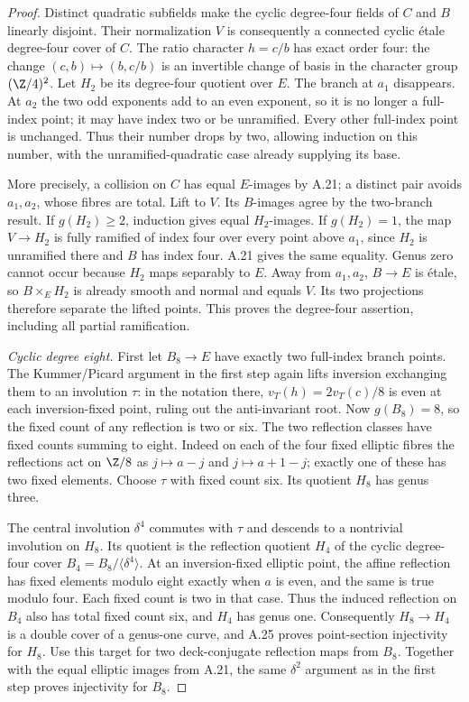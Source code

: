 \begin{proof}
Distinct quadratic subfields make the cyclic
degree-four fields of $C$ and $B$ linearly disjoint.
Their normalization $V$ is consequently a connected
cyclic \'etale degree-four cover of $C$. The ratio
character $h=c/b$ has exact order four: the change
$(c,b)\mapsto(b,c/b)$ is an invertible change of basis
in the character group $(\Z/4)^2$. Let $H_2$ be its
degree-four quotient over $E$. The branch at $a_1$
disappears. At $a_2$ the two odd exponents add to an
even exponent, so it is no longer a full-index point;
it may have index two or be unramified. Every other
full-index point is unchanged. Thus their number drops
by two, allowing induction on this number, with the
unramified-quadratic case already supplying its base.

More precisely, a collision on $C$ has equal $E$-images
by A.21; a distinct pair avoids $a_1,a_2$, whose fibres
are total. Lift to $V$. Its $B$-images agree by the
two-branch result. If $g(H_2)\ge2$, induction gives
equal $H_2$-images. If $g(H_2)=1$, the map $V\to H_2$
is fully ramified of index four over every point above
$a_1$, since $H_2$ is unramified there and $B$ has
index four. A.21 gives the same equality. Genus zero
cannot occur because $H_2$ maps separably to $E$.
Away from $a_1,a_2$, $B\to E$ is \'etale, so
$B\times_EH_2$ is already smooth and normal and equals
$V$. Its two projections therefore separate the lifted
points. This proves the degree-four assertion, including
all partial ramification.

\emph{Cyclic degree eight.}
First let $B_8\to E$ have exactly two full-index branch
points. The Kummer/Picard argument in the first step
again lifts inversion exchanging them to an involution
$\tau$: in the notation there, $v_T(h)=2v_T(c)/8$ is
even at each inversion-fixed point, ruling out the
anti-invariant root. Now $g(B_8)=8$, so the fixed count
of any reflection is two or six. The two reflection
classes have fixed counts summing to eight. Indeed on
each of the four fixed elliptic fibres the reflections
act on $\Z/8$ as $j\mapsto a-j$ and $j\mapsto a+1-j$;
exactly one of these has two fixed elements. Choose
$\tau$ with fixed count six. Its quotient $H_8$ has
genus three.

The central involution $\delta^4$ commutes with $\tau$
and descends to a nontrivial involution on $H_8$. Its
quotient is the reflection quotient $H_4$ of the cyclic
degree-four cover $B_4=B_8/\langle\delta^4\rangle$.
At an inversion-fixed elliptic point, the affine
reflection has fixed elements modulo eight exactly when
$a$ is even, and the same is true modulo four. Each
fixed count is two in that case. Thus the induced
reflection on $B_4$ also has total fixed count six,
and $H_4$ has genus one. Consequently
$H_8\to H_4$ is a double cover of a genus-one curve,
and A.25 proves point-section injectivity for $H_8$.
Use this target for two deck-conjugate reflection maps
from $B_8$. Together with the equal elliptic images
from A.21, the same $\delta^2$ argument as in the first
step proves injectivity for $B_8$.


\end{proof}
